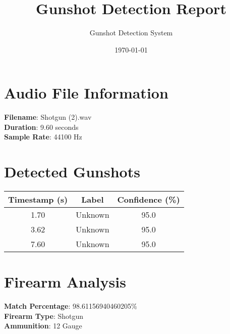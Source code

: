 \documentclass{article}
\title{Gunshot Detection Report}
\author{Gunshot Detection System}
\date{\today}
\begin{document}
\maketitle

\section*{Audio File Information}
\textbf{Filename}: Shotgun (2).wav\\
\textbf{Duration}: 9.60 seconds\\
\textbf{Sample Rate}: 44100 Hz

\section*{Detected Gunshots}
\begin{tabular}{|c|c|c|}
\hline
Timestamp (s) & Label & Confidence (\%)\\
\hline
1.70 & Unknown & 95.0\\
\hline
3.62 & Unknown & 95.0\\
\hline
7.60 & Unknown & 95.0\\
\hline
\end{tabular}

\section*{Firearm Analysis}
\textbf{Match Percentage}: 98.61156940460205\%\\
\textbf{Firearm Type}: Shotgun\\
\textbf{Ammunition}: 12 Gauge\\
\end{document}
